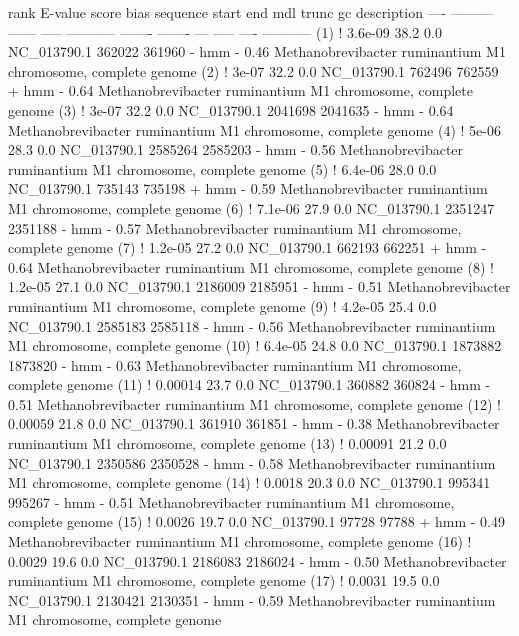 \begin{sreoutput}
 rank     E-value  score  bias  sequence      start     end   mdl trunc   gc  description
 ----   --------- ------ -----  ----------- ------- -------   --- ----- ----  -----------
  (1) !   3.6e-09   38.2   0.0  NC_013790.1  362022  361960 - hmm     - 0.46  Methanobrevibacter ruminantium M1 chromosome, complete genome
  (2) !     3e-07   32.2   0.0  NC_013790.1  762496  762559 + hmm     - 0.64  Methanobrevibacter ruminantium M1 chromosome, complete genome
  (3) !     3e-07   32.2   0.0  NC_013790.1 2041698 2041635 - hmm     - 0.64  Methanobrevibacter ruminantium M1 chromosome, complete genome
  (4) !     5e-06   28.3   0.0  NC_013790.1 2585264 2585203 - hmm     - 0.56  Methanobrevibacter ruminantium M1 chromosome, complete genome
  (5) !   6.4e-06   28.0   0.0  NC_013790.1  735143  735198 + hmm     - 0.59  Methanobrevibacter ruminantium M1 chromosome, complete genome
  (6) !   7.1e-06   27.9   0.0  NC_013790.1 2351247 2351188 - hmm     - 0.57  Methanobrevibacter ruminantium M1 chromosome, complete genome
  (7) !   1.2e-05   27.2   0.0  NC_013790.1  662193  662251 + hmm     - 0.64  Methanobrevibacter ruminantium M1 chromosome, complete genome
  (8) !   1.2e-05   27.1   0.0  NC_013790.1 2186009 2185951 - hmm     - 0.51  Methanobrevibacter ruminantium M1 chromosome, complete genome
  (9) !   4.2e-05   25.4   0.0  NC_013790.1 2585183 2585118 - hmm     - 0.56  Methanobrevibacter ruminantium M1 chromosome, complete genome
 (10) !   6.4e-05   24.8   0.0  NC_013790.1 1873882 1873820 - hmm     - 0.63  Methanobrevibacter ruminantium M1 chromosome, complete genome
 (11) !   0.00014   23.7   0.0  NC_013790.1  360882  360824 - hmm     - 0.51  Methanobrevibacter ruminantium M1 chromosome, complete genome
 (12) !   0.00059   21.8   0.0  NC_013790.1  361910  361851 - hmm     - 0.38  Methanobrevibacter ruminantium M1 chromosome, complete genome
 (13) !   0.00091   21.2   0.0  NC_013790.1 2350586 2350528 - hmm     - 0.58  Methanobrevibacter ruminantium M1 chromosome, complete genome
 (14) !    0.0018   20.3   0.0  NC_013790.1  995341  995267 - hmm     - 0.51  Methanobrevibacter ruminantium M1 chromosome, complete genome
 (15) !    0.0026   19.7   0.0  NC_013790.1   97728   97788 + hmm     - 0.49  Methanobrevibacter ruminantium M1 chromosome, complete genome
 (16) !    0.0029   19.6   0.0  NC_013790.1 2186083 2186024 - hmm     - 0.50  Methanobrevibacter ruminantium M1 chromosome, complete genome
 (17) !    0.0031   19.5   0.0  NC_013790.1 2130421 2130351 - hmm     - 0.59  Methanobrevibacter ruminantium M1 chromosome, complete genome

\end{sreoutput}
